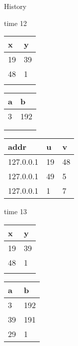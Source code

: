 \begin{block}{History}
  \begin{center}
    \ttfamily
    \begin{minipage}{0.3\textwidth}
      time 12

      \vspace{0.5cm}

      \begin{tabularx}{0.47\textwidth}{|X|X|}
        \hline\rowcolor{red!20}
        \textbf{x} & \textbf{y} \\\hline
        19         & 39 \\\hline
        48         & 1 \\\hline
                   &   \\\hline
      \end{tabularx}
      \hfill
      \begin{tabularx}{0.47\textwidth}{|X|X|}
        \hline\rowcolor{green!20}
        \textbf{a} & \textbf{b} \\\hline
        3          & 192 \\\hline
                   & \\\hline
                   &  \\\hline
      \end{tabularx}

      \vspace{0.5cm}

      \begin{tabularx}{\textwidth}{|X|l|l|}
        \hline\rowcolor{blue!20}
        \textbf{addr}  & \textbf{u} & \textbf{v} \\\hline
        127.0.0.1 & 19         & 48 \\\hline
        127.0.0.1 & 49         & 5 \\\hline
        127.0.0.1 & 1          & 7 \\\hline
      \end{tabularx}
    \end{minipage}
    \hfill
    \begin{minipage}{0.3\textwidth}
      time 13

      \vspace{0.5cm}

      \begin{tabularx}{0.47\textwidth}{|X|X|}
        \hline\rowcolor{red!20}
        \textbf{x} & \textbf{y} \\\hline
        19         & 39 \\\hline
        48         & 1 \\\hline
                   &   \\\hline
      \end{tabularx}
      \hfill
      \begin{tabularx}{0.47\textwidth}{|X|X|}
        \hline\rowcolor{green!20}
        \textbf{a} & \textbf{b} \\\hline
        3          & 192 \\\hline
        39         & 191 \\\hline
        29         & 1 \\\hline
      \end{tabularx}


\end{minipage}
\end{center}
\end{block}
